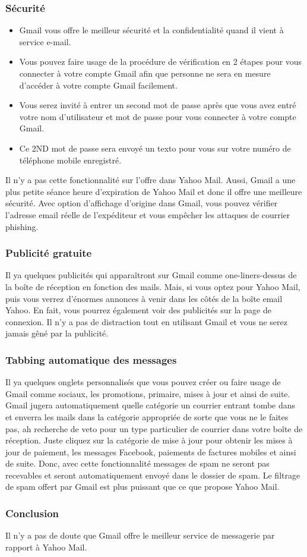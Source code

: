 \documentclass[french]{report}
\begin{document}
\subsubsection{\LARGE Sécurité}
\begin{itemize}
\LARGE
\item Gmail vous offre le meilleur sécurité et la confidentialité quand il vient à service e-mail.
\item Vous pouvez faire usage de la procédure de vérification en 2 étapes pour vous connecter à votre compte Gmail afin que personne ne sera en mesure d'accéder à votre compte Gmail facilement.
\item Vous serez invité à entrer un second mot de passe après que vous avez entré votre nom d'utilisateur et mot de passe pour vous connecter à votre compte Gmail.
\item Ce 2ND mot de passe sera envoyé un texto pour vous sur votre numéro de téléphone mobile enregistré.
\end{itemize}
\LARGE Il n'y a pas cette fonctionnalité sur l'offre dans Yahoo Mail. Aussi, Gmail a une plus petite séance heure d'expiration de Yahoo Mail et donc il offre une meilleure sécurité. Avec option d'affichage d'origine dans Gmail, vous pouvez vérifier l'adresse email réelle de l'expéditeur et vous empêcher les attaques de courrier phishing.
\subsubsection{\LARGE Publicité gratuite}
\LARGE Il ya quelques publicités qui apparaîtront sur Gmail comme one-liners-dessus de la boîte de réception en fonction des mails. Mais, si vous optez pour Yahoo Mail, puis vous verrez d'énormes annonces à venir dans les côtés de la boîte email Yahoo. En fait, vous pourrez également voir des publicités sur la page de connexion. Il n'y a pas de distraction tout en utilisant Gmail et vous ne serez jamais gêné par la publicité.
\subsubsection{\LARGE Tabbing automatique des messages}
\LARGE Il ya quelques onglets personnalisés que vous pouvez créer ou faire usage de Gmail comme sociaux, les promotions, primaire, mises à jour et ainsi de suite. Gmail jugera automatiquement quelle catégorie un courrier entrant tombe dans et enverra les mails dans la catégorie appropriée de sorte que vous ne le faites pas, ah recherche de veto pour un type particulier de courrier dans votre boîte de réception. Juste cliquez sur la catégorie de mise à jour pour obtenir les mises à jour de paiement, les messages Facebook, paiements de factures mobiles et ainsi de suite. Donc, avec cette fonctionnalité messages de spam ne seront pas recevables et seront automatiquement envoyé dans le dossier de spam. Le filtrage de spam offert par Gmail est plus puissant que ce que propose Yahoo Mail.
\subsubsection{\LARGE Conclusion}
\LARGE Il n'y a pas de doute que Gmail offre le meilleur service de messagerie par rapport à Yahoo Mail.
\end{document}
